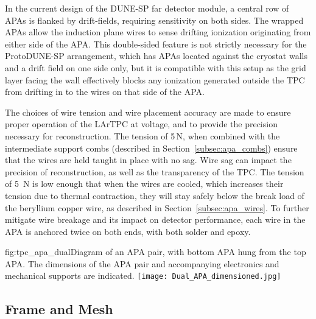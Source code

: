 In the current design of the DUNE-SP far detector module, a central row of APAs is flanked by  drift-fields, requiring sensitivity on both sides. The wrapped APAs allow the induction plane wires to sense drifting ionization originating from either side of the APA.  This double-sided feature is not strictly necessary for the ProtoDUNE-SP arrangement, which has APAs located against the cryostat walls and a drift field on one side only, but it is compatible with this setup as the grid layer facing the wall effectively blocks any ionization generated outside the TPC from drifting in to the wires on that side of the APA.

The choices of wire tension and wire placement accuracy are made to ensure proper operation of the LArTPC at voltage, and to provide the precision necessary for reconstruction.  The tension of 5\,N, when combined with the intermediate support combs (described in Section~\ref{subsec:apa_combs}) ensure that the wires are held taught in place with no sag.  Wire sag can impact the precision of reconstruction, as well as the transparency of the TPC.  The tension of 5~N is low enough that when the wires are cooled, which increases their tension due to thermal contraction, they will stay safely below the break load of the beryllium copper wire, as described in Section~\ref{subsec:apa_wires}.  To further mitigate wire breakage and its impact on detector performance, each wire in the APA is anchored twice on both ends, with both solder and epoxy.  

\begin{dunefigure}{fig:tpc_apa_dual}{Diagram of an APA pair,
    with bottom APA hung from the top APA. The dimensions of the APA pair and
    accompanying electronics and mechanical supports are indicated.}
\texttt{[image: Dual\_APA\_dimensioned.jpg]} 
\end{dunefigure}

\subsection{Frame and Mesh}
\label{sec:fdsp-apa-frames}


